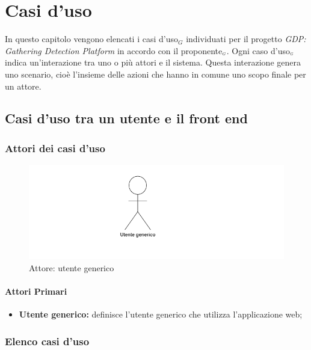 \chapter{Casi d'uso}\label{CasiDUso}
In questo capitolo vengono elencati i casi d'uso$_G$ individuati per il progetto \textit{GDP: Gathering Detection Platform} in accordo con il proponente$_{\scaleto{G}{3pt}}$. Ogni caso d'uso$_{\scaleto{G}{3pt}}$ indica un'interazione tra uno o più attori e il sistema. Questa interazione genera uno scenario, cioè l'insieme delle azioni che hanno in comune uno scopo finale per un attore.

\section{Casi d'uso tra un utente e il front end}\label{CasiDUsoCasiDUsoTraUnUtenteEIlFrontEnd}
\subsection{Attori dei casi d'uso}\label{CasiDUsoCasiDUsoTraUnUtenteEIlFrontEndAttoriDeiCasiDUso}
\begin{center}
	\begin{figure}[H]
		\includegraphics{../immagini/attori_casi/utente_generico.png}
		\caption{Attore: utente generico}
	\end{figure}
\end{center}
\subsubsection{Attori Primari}\label{CasiDUsoCasiDUsoTraUnUtenteEIlFrontEndAttoriDeiCasiDUsoAttoriPrimari}
\begin{itemize}
	\item \textbf{Utente generico:} definisce l'utente generico che utilizza l'applicazione web;
\end{itemize}

\subsection{Elenco casi d'uso}\label{CasiDUsoCasiDUsoTraUnUtenteEIlFrontEndElencoCasiDUso}

